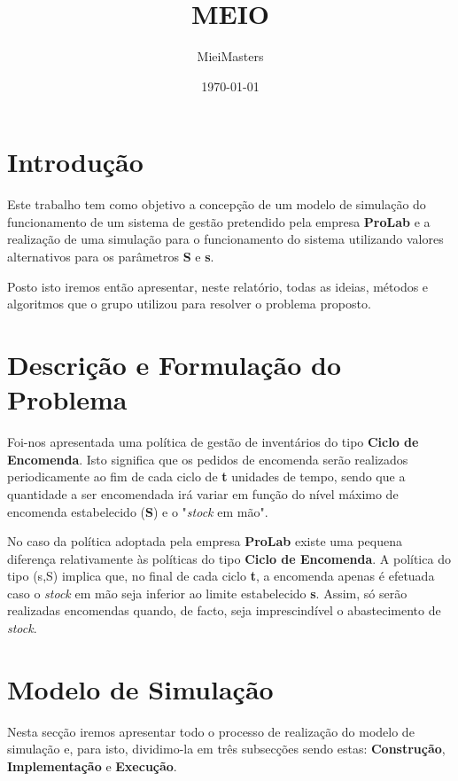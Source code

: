 \documentclass[a4paper]{article}
\title{MEIO}
\author{MieiMasters}
\date{\today}
\begin{document}
\maketitle

\newpage

\tableofcontents


\newpage

\section{Introdução}
\label{sec:intro}

Este trabalho tem como objetivo a concepção de um modelo de simulação do funcionamento de um sistema de gestão pretendido pela empresa \textbf{ProLab} e a realização de uma simulação para o funcionamento do sistema utilizando valores alternativos para os parâmetros \textbf{S} e \textbf{s}.

Posto isto iremos então apresentar, neste relatório, todas as ideias, métodos e algoritmos que o grupo utilizou para resolver o problema proposto.

\section{Descrição e Formulação do Problema}
\label{sec:descricao}

Foi-nos apresentada uma política de gestão de inventários do tipo \textbf{Ciclo de Encomenda}. Isto significa que os pedidos de encomenda serão realizados periodicamente ao fim de cada ciclo de \textbf{t} unidades de tempo, sendo que a quantidade a ser encomendada irá variar em função do nível máximo de encomenda estabelecido (\textbf{S}) e o "\textit{stock} em mão".

No caso da política adoptada pela empresa \textbf{ProLab} existe uma pequena diferença relativamente às políticas do tipo \textbf{Ciclo de Encomenda}. A política do tipo (s,S) implica que, no final de cada ciclo \textbf{t}, a encomenda apenas é efetuada caso o \textit{stock} em mão seja inferior ao limite estabelecido \textbf{s}. Assim, só serão realizadas encomendas quando, de facto, seja imprescindível o abastecimento de \textit{stock}.

\section{Modelo de Simulação}
\label{sec:modelo}

Nesta secção iremos apresentar todo o processo de realização do modelo de simulação e, para isto, dividimo-la em três subsecções sendo estas: \textbf{Construção}, \textbf{Implementação} e \textbf{Execução}.
\end{document}
